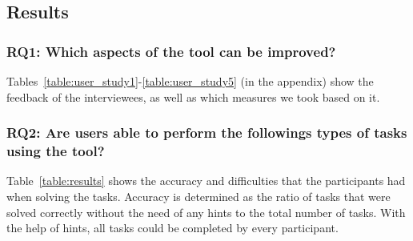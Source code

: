 \subsection{Results}\label{subsec:results}


\subsubsection{\textbf{RQ1:} Which aspects of the tool can be improved?}\label{subsubsec:rq1} %
Tables~\ref{table:user_study1}-\ref{table:user_study5} (in the appendix) show the feedback of the interviewees, as well as which measures we took based on it.



\subsubsection{\textbf{RQ2:} Are users able to perform the followings types of tasks using the tool?}
Table~\ref{table:results} shows the accuracy and difficulties that the participants had when solving the tasks.
Accuracy is determined as the ratio of tasks that were solved correctly without the need of any hints to the total number of tasks.
With the help of hints, all tasks could be completed by every participant.

